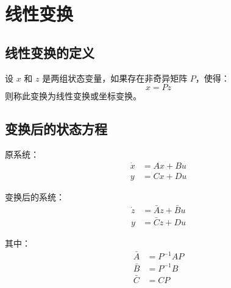 \section{线性变换}

\subsection{线性变换的定义}
设 $x$ 和 $z$ 是两组状态变量，如果存在非奇异矩阵 $P$，使得：
\[x = Pz\]
则称此变换为线性变换或坐标变换。

\subsection{变换后的状态方程}
原系统：
\begin{align}
\dot{x} &= Ax + Bu \\
y &= Cx + Du
\end{align}

变换后的系统：
\begin{align}
\dot{z} &= \bar{A}z + \bar{B}u \\
y &= \bar{C}z + Du
\end{align}

其中：
\begin{align}
\bar{A} &= P^{-1}AP \\
\bar{B} &= P^{-1}B \\
\bar{C} &= CP
\end{align}

